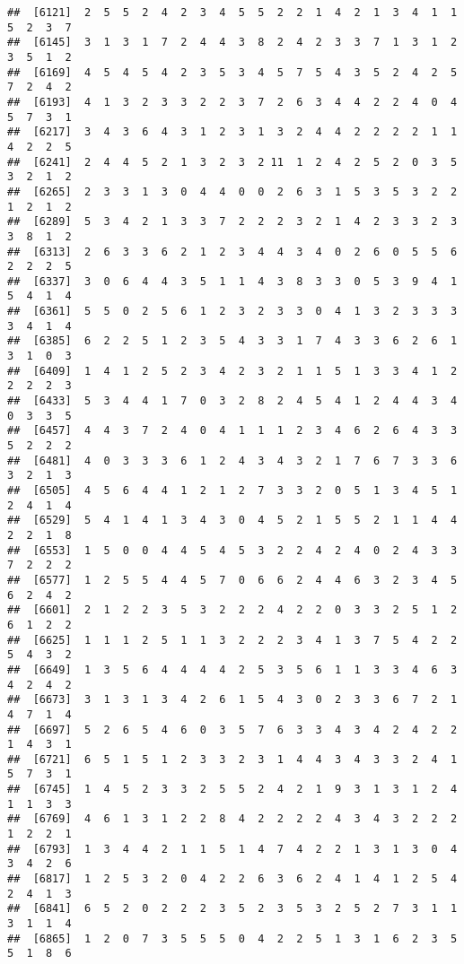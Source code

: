 \documentclass[
]{article}
\begin{document}
\begin{verbatim}
##  [6121]  2  5  5  2  4  2  3  4  5  5  2  2  1  4  2  1  3  4  1  1  5  2  3  7
##  [6145]  3  1  3  1  7  2  4  4  3  8  2  4  2  3  3  7  1  3  1  2  3  5  1  2
##  [6169]  4  5  4  5  4  2  3  5  3  4  5  7  5  4  3  5  2  4  2  5  7  2  4  2
##  [6193]  4  1  3  2  3  3  2  2  3  7  2  6  3  4  4  2  2  4  0  4  5  7  3  1
##  [6217]  3  4  3  6  4  3  1  2  3  1  3  2  4  4  2  2  2  2  1  1  4  2  2  5
##  [6241]  2  4  4  5  2  1  3  2  3  2 11  1  2  4  2  5  2  0  3  5  3  2  1  2
##  [6265]  2  3  3  1  3  0  4  4  0  0  2  6  3  1  5  3  5  3  2  2  1  2  1  2
##  [6289]  5  3  4  2  1  3  3  7  2  2  2  3  2  1  4  2  3  3  2  3  3  8  1  2
##  [6313]  2  6  3  3  6  2  1  2  3  4  4  3  4  0  2  6  0  5  5  6  2  2  2  5
##  [6337]  3  0  6  4  4  3  5  1  1  4  3  8  3  3  0  5  3  9  4  1  5  4  1  4
##  [6361]  5  5  0  2  5  6  1  2  3  2  3  3  0  4  1  3  2  3  3  3  3  4  1  4
##  [6385]  6  2  2  5  1  2  3  5  4  3  3  1  7  4  3  3  6  2  6  1  3  1  0  3
##  [6409]  1  4  1  2  5  2  3  4  2  3  2  1  1  5  1  3  3  4  1  2  2  2  2  3
##  [6433]  5  3  4  4  1  7  0  3  2  8  2  4  5  4  1  2  4  4  3  4  0  3  3  5
##  [6457]  4  4  3  7  2  4  0  4  1  1  1  2  3  4  6  2  6  4  3  3  5  2  2  2
##  [6481]  4  0  3  3  3  6  1  2  4  3  4  3  2  1  7  6  7  3  3  6  3  2  1  3
##  [6505]  4  5  6  4  4  1  2  1  2  7  3  3  2  0  5  1  3  4  5  1  2  4  1  4
##  [6529]  5  4  1  4  1  3  4  3  0  4  5  2  1  5  5  2  1  1  4  4  2  2  1  8
##  [6553]  1  5  0  0  4  4  5  4  5  3  2  2  4  2  4  0  2  4  3  3  7  2  2  2
##  [6577]  1  2  5  5  4  4  5  7  0  6  6  2  4  4  6  3  2  3  4  5  6  2  4  2
##  [6601]  2  1  2  2  3  5  3  2  2  2  4  2  2  0  3  3  2  5  1  2  6  1  2  2
##  [6625]  1  1  1  2  5  1  1  3  2  2  2  3  4  1  3  7  5  4  2  2  5  4  3  2
##  [6649]  1  3  5  6  4  4  4  4  2  5  3  5  6  1  1  3  3  4  6  3  4  2  4  2
##  [6673]  3  1  3  1  3  4  2  6  1  5  4  3  0  2  3  3  6  7  2  1  4  7  1  4
##  [6697]  5  2  6  5  4  6  0  3  5  7  6  3  3  4  3  4  2  4  2  2  1  4  3  1
##  [6721]  6  5  1  5  1  2  3  3  2  3  1  4  4  3  4  3  3  2  4  1  5  7  3  1
##  [6745]  1  4  5  2  3  3  2  5  5  2  4  2  1  9  3  1  3  1  2  4  1  1  3  3
##  [6769]  4  6  1  3  1  2  2  8  4  2  2  2  2  4  3  4  3  2  2  2  1  2  2  1
##  [6793]  1  3  4  4  2  1  1  5  1  4  7  4  2  2  1  3  1  3  0  4  3  4  2  6
##  [6817]  1  2  5  3  2  0  4  2  2  6  3  6  2  4  1  4  1  2  5  4  2  4  1  3
##  [6841]  6  5  2  0  2  2  2  3  5  2  3  5  3  2  5  2  7  3  1  1  3  1  1  4
##  [6865]  1  2  0  7  3  5  5  5  0  4  2  2  5  1  3  1  6  2  3  5  5  1  8  6

\end{verbatim}
\end{document}
